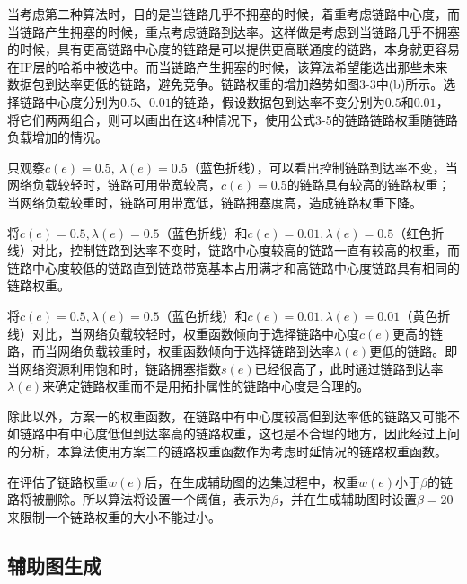 当考虑第二种算法时，目的是当链路几乎不拥塞的时候，着重考虑链路中心度，而当链路产生拥塞的时候，重点考虑链路到达率。这样做是考虑到当链路几乎不拥塞的时候，具有更高链路中心度的链路是可以提供更高联通度的链路，本身就更容易在IP层的哈希中被选中。而当链路产生拥塞的时候，该算法希望能选出那些未来数据包到达率更低的链路，避免竞争。链路权重的增加趋势如图3-3中(b)所示。选择链路中心度分别为$0.5$、$0.01$的链路，假设数据包到达率不变分别为$0.5$和$0.01$，将它们两两组合，则可以画出在这4种情况下，使用公式3-5的链路链路权重随链路负载增加的情况。


只观察$c(e)=0.5,\ \lambda(e)=0.5$（蓝色折线），可以看出控制链路到达率不变，当网络负载较轻时，链路可用带宽较高，$c(e)=0.5$的链路具有较高的链路权重；当网络负载较重时，链路可用带宽低，链路拥塞度高，造成链路权重下降。

将$c(e)=0.5,\lambda(e)=0.5$（蓝色折线）和$c\left(e\right)=0.01,\lambda\left(e\right)=0.5$（红色折线）对比，控制链路到达率不变时，链路中心度较高的链路一直有较高的权重，而链路中心度较低的链路直到链路带宽基本占用满才和高链路中心度链路具有相同的链路权重。

将$c(e)=0.5,\lambda(e)=0.5$（蓝色折线）和$c\left(e\right)=0.01,\lambda\left(e\right)=0.01$（黄色折线）对比，当网络负载较轻时，权重函数倾向于选择链路中心度$c\left(e\right)$更高的链路，而当网络负载较重时，权重函数倾向于选择链路到达率$\lambda\left(e\right)$更低的链路。即当网络资源利用饱和时，链路拥塞指数$s\left(e\right)$已经很高了，此时通过链路到达率$\lambda\left(e\right)$来确定链路权重而不是用拓扑属性的链路中心度是合理的。

除此以外，方案一的权重函数，在链路中有中心度较高但到达率低的链路又可能不如链路中有中心度低但到达率高的链路权重，这也是不合理的地方，因此经过上问的分析，本算法使用方案二的链路权重函数作为考虑时延情况的链路权重函数。

在评估了链路权重$w\left(e\right)$后，在生成辅助图的边集过程中，权重$w\left(e\right)$小于$\beta$的链路将被删除。所以算法将设置一个阈值，表示为$\beta$，并在生成辅助图时设置$\beta=20$来限制一个链路权重的大小不能过小。

\subsection{辅助图生成}


